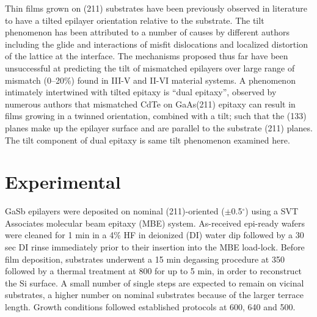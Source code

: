 Thin films grown on (211) substrates have been previously observed in literature to have a tilted epilayer orientation relative to the substrate.\cite{Zhao2011,Wang2006,Dhar1997a,Lange1991,Nakamura1992} The tilt phenomenon has been attributed to a number of causes by different authors including the glide and interactions of misfit dislocations \cite{Olsen1975,Riesz1994,Ayers1991,Johnson2011} and localized distortion of the lattice at the interface.\cite{Sasaki1992} The mechanisms proposed thus far have been unsuccessful at predicting the tilt of mismatched epilayers over large range of mismatch (0--20\%) found in III-V and II-VI material systems. A phenomenon intimately intertwined with tilted epitaxy is ``dual epitaxy'', observed by numerous authors\cite{Li1995a,Nakamura1992,Rujirawat1998,Lange1991} that mismatched CdTe on GaAs(211) epitaxy can result in films growing in a twinned orientation, combined with a tilt; such that the (133) planes make up the epilayer surface and are parallel to the substrate (211) planes. The tilt component of dual epitaxy is same tilt phenomenon examined here.

\section{Experimental}
GaSb epilayers were deposited on nominal (211)-oriented ($\pm$0.5$^\circ$) using a SVT Associates molecular beam epitaxy (MBE) system. As-received epi-ready wafers were cleaned for 1 min in a 4\% HF in deionized (DI) water dip followed by a 30 sec DI rinse immediately prior to their insertion into the MBE load-lock. Before film deposition, substrates underwent a 15 min degassing procedure at 350\celsius{} followed by a thermal treatment at 800\celsius{} for up to 5 min, in order to reconstruct the Si surface. A small number of single steps are expected to remain on vicinal substrates, a higher number on nominal substrates because of the larger terrace length. Growth conditions followed established protocols\cite{Akahane2004,Balakrishnan2006a,Fischer1986} at 600, 640 and 500\celsius. 

